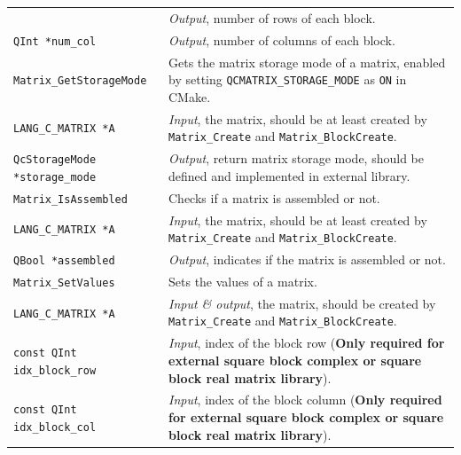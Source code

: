 \documentclass[a4paper,11pt,twoside,openright]{book}
\begin{document}
\begin{center}
\begin{longtable}{l|p{}}
      & \textsl{Output}, number of rows of each block.\\
    \hspace*{2ex}\verb|QInt *num_col| %
      & \textsl{Output}, number of columns of each block.\\
    \hline
%
    \verb|Matrix_GetStorageMode|\index{\texttt{Matrix\_GetStorageMode}} %
      & Gets the matrix storage mode of a matrix, enabled by setting
        \verb|QCMATRIX_STORAGE_MODE| as \verb|ON| in CMake.\\
    \hspace*{2ex}\verb|LANG_C_MATRIX *A| %
      & \textsl{Input}, the matrix, should be at least created by \verb|Matrix_Create|
        and \verb|Matrix_BlockCreate|.\\
    \hspace*{2ex}\verb|QcStorageMode *storage_mode| %
      & \textsl{Output}, return matrix storage mode, should be defined and
        implemented in external library.\\
    \hline
%
    \verb|Matrix_IsAssembled|\index{\texttt{Matrix\_IsAssembled}} %
      & Checks if a matrix is assembled or not.\\
    \hspace*{2ex}\verb|LANG_C_MATRIX *A| %
      & \textsl{Input}, the matrix, should be at least created by \verb|Matrix_Create|
        and \verb|Matrix_BlockCreate|.\\
    \hspace*{2ex}\verb|QBool *assembled| %
      & \textsl{Output}, indicates if the matrix is assembled or not.\\
    \hline
%
    \verb|Matrix_SetValues|\index{\texttt{Matrix\_SetValues}} %
      & Sets the values of a matrix.\\
    \hspace*{2ex}\verb|LANG_C_MATRIX *A| %
      & \textsl{Input \& output}, the matrix, should be created by \verb|Matrix_Create|
        and \verb|Matrix_BlockCreate|.\\
    \hspace*{2ex}\verb|const QInt idx_block_row| %
      & \textsl{Input}, index of the block row %
        (\textbf{Only required for external square block complex or
        square block real matrix library}).\\
    \hspace*{2ex}\verb|const QInt idx_block_col| %
      & \textsl{Input}, index of the block column %
        (\textbf{Only required for external square block complex or
        square block real matrix library}).\\

\end{longtable}
\end{center}
\end{document}
